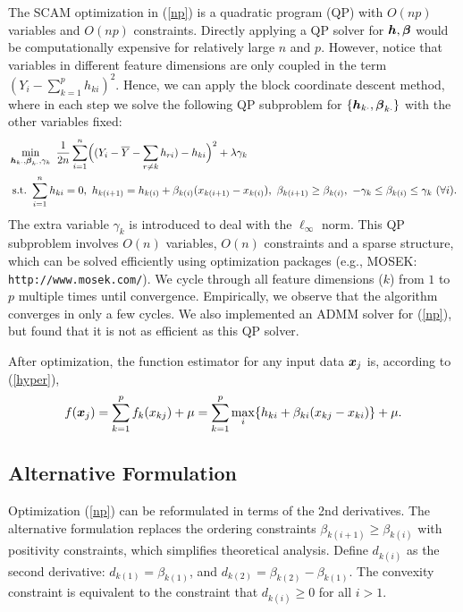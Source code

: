 The SCAM optimization in (\ref{np}) is a quadratic program (QP) with
$O(np)$ variables and $O(np)$ constraints. 
Directly applying a QP solver for $\boldsymbol{h},
\boldsymbol{\beta}$ would be computationally expensive for relatively large
$n$ and $p$. However, notice that variables in different feature
dimensions are only coupled in the term
$(Y_{i}-\sum_{k=1}^{p}h_{ki})^{2}$. Hence, we can apply the block
coordinate descent method, where in each step we solve the following
QP subproblem for $\{\boldsymbol{h}_{k\cdot},\boldsymbol{\beta}_{k\cdot}\}$ with the
other variables fixed:
\begin{equation}\begin{split}\nonumber
       &\min_{\bds{h}_{k\cdot},\bds{\beta}_{k\cdot},\gamma_{k}} 
             \ \frac{1}{2n}\sum_{i=1}^{n}\Bigl((Y_{i}-\bar{Y}-\sum_{r\neq{k}}h_{ri})-h_{ki}\Bigr)^{2} 
                      + \lambda\gamma_{k} \\
        &\ \textrm{s.t.} \ \sum_{i=1}^{n}h_{ki}=0, \ h_{k(i+1)} = h_{k(i)} + \beta_{k(i)}(x_{k(i+1)}-x_{k(i)}), \ \beta_{k(i+1)} \geq \beta_{k(i)}, \ -\gamma_{k}\leq\beta_{k(i)}\leq\gamma_{k} \ (\forall i).
\end{split}\end{equation}
The extra variable $\gamma_{k}$ is introduced to deal with the $\ell_{\infty}$ norm. This QP subproblem involves $O(n)$ variables, $O(n)$ constraints and a sparse structure, 
which can be solved efficiently using optimization packages (e.g., MOSEK: \verb+http://www.mosek.com/+).  We cycle through all feature dimensions ($k$) from $1$ to $p$ multiple times until convergence.
Empirically, we observe that the algorithm converges in only a few cycles. We also implemented an ADMM solver for (\ref{np}), but found that it is not as efficient as this QP solver.

After optimization, the function estimator for any input data $\boldsymbol{x}_j$ is, according to (\ref{hyper}),
\begin{equation}\nonumber
      f(\boldsymbol{x}_j) = \sum_{k=1}^{p}f_k(x_{kj})+\mu = \sum_{k=1}^{p}\max_{i} \{h_{ki}+\beta_{ki}(x_{kj}-x_{ki})\} + \mu.
\end{equation} 


\subsection{Alternative Formulation}
Optimization (\ref{np}) can be reformulated in terms of the 2nd derivatives. The alternative formulation replaces the ordering
constraints $\beta_{k(i+1)} \geq \beta_{k(i)}$ with positivity
constraints, which simplifies theoretical analysis.
Define $d_{k(i)}$ as the second derivative:
$d_{k(1)} = \beta_{k(1)}$, and $d_{k(2)} =
\beta_{k(2)} - \beta_{k(1)}$. The convexity constraint is
equivalent to the constraint that $d_{k(i)} \geq 0$ for all $i >
1$.

